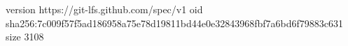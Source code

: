 version https://git-lfs.github.com/spec/v1
oid sha256:7c009f57f5ad186958a75e78d19811bd44e0e32843968fbf7a6bd6f79883c631
size 3108
